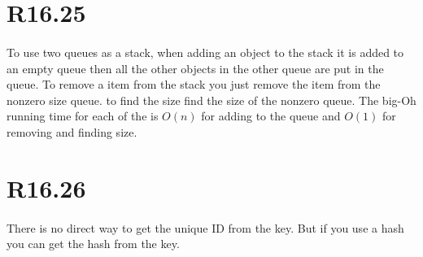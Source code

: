 \documentclass{article}
\begin{document}
\section{R16.25}
\paragraph{}To use two queues as a stack, when adding an object to the stack it is added to an empty queue then all the other objects in the other queue are put in the queue. To remove a item from the stack you just remove the item from the nonzero size queue. to find the size find the size of the nonzero queue.  The big-Oh running
time for each of the is $O(n)$ for adding to the queue and $O(1)$ for removing and finding size.
\section{R16.26}
\paragraph{}There is no direct way to get the unique ID from the key. But if you use a hash you can get the hash from the key.
\end{document}
